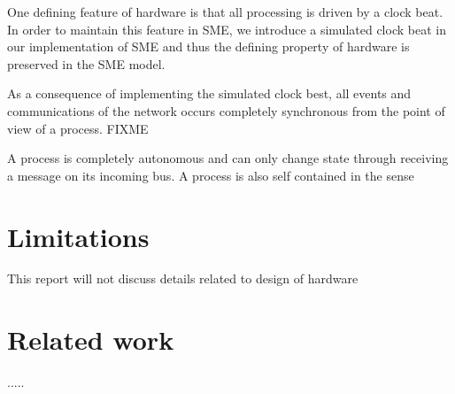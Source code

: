 


\begin{property} One defining feature of
    hardware is that all processing is driven by a clock beat. In
    order to maintain this feature in SME, we introduce a simulated
    clock beat in our implementation of SME and thus the defining
    property of hardware is preserved in the SME model.
\end{property}

\begin{property}
  \label{synchro}
  As a consequence of implementing the simulated clock best, all
  events and communications of the network occurs completely
  synchronous from the point of view of a process. FIXME
\end{property}

\begin{property}
  \label{noshare}
  A process is completely autonomous and can only change state through
  receiving a message on its incoming bus. A process is also self
  contained in the sense
\end{property}



\section{Limitations}
This report will not discuss details related to design of hardware

\section{Related work}
.....

